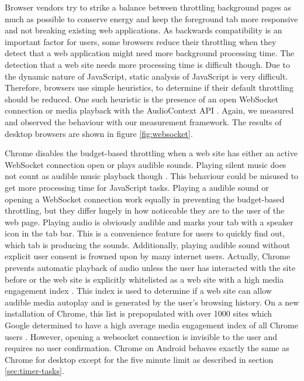 \documentclass[
	ruledheaders=section,%
	class=report,%
	thesis={type=bachelor},%
	accentcolor=9c,%
	custommargins=true,%
	marginpar=false,%
	parskip=half-,%
	fontsize=11pt,%
]{tudapub}
\begin{document}
  Browser vendors try to strike a balance between throttling background pages as much as possible to conserve energy and keep the foreground tab more responsive and not breaking existing web applications. As backwards compatibility is an important factor for users, some browsers reduce their throttling when they detect that a web application might need more background processing time. The detection that a web site needs more processing time is difficult though. Due to the dynamic nature of JavaScript, static analysis of JavaScript is very difficult. Therefore, browsers use simple heuristics, to determine if their default throttling should be reduced. One such heuristic is the presence of an open WebSocket connection \cite{mdn-websocket} or media playback with the AudioContext API \cite{mdn-audiocontext}. Again, we measured and observed the behaviour with our measurement framework. The results of desktop browsers are shown in figure \ref{fig:websocket}.

  Chrome disables the budget-based throttling when a web site has either an active WebSocket connection open or plays audible sounds. Playing silent music does not count as audible music playback though \cite{chrome-background-tabs}. This behaviour could be misused to get more processing time for JavaScript tasks. Playing a audible sound or opening a WebSocket connection work equally in preventing the budget-based throttling, but they differ hugely in how noticeable they are to the user of the web page. Playing audio is obviously audible and marks your tab with a speaker icon in the tab bar. This is a convenience feature for users to quickly find out, which tab is producing the sounds. Additionally, playing audible sound without explicit user consent is frowned upon by many internet users. Actually, Chrome prevents automatic playback of audio unless the user has interacted with the site before or the web site is explicitly whitelisted as a web site with a high media engagement index \cite{chrome-media-engagement-index}. This index is used to determine if a web site can allow audible media autoplay and is generated by the user's browsing history. On a new installation of Chrome, this list is prepopulated with over 1000 sites which Google determined to have a high average media engagement index of all Chrome users \cite{chrome-autoplay}. However, opening a websocket connection is invisible to the user and requires no user confirmation. Chrome on Android behaves exactly the same as Chrome for desktop except for the five minute limit as described in section \ref{sec:timer-tasks}.
\end{document}
